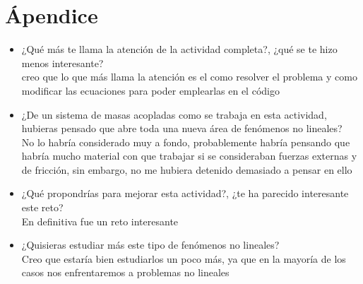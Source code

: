 \documentclass{article}
\begin{document}
\section{Ápendice}
\begin{itemize}
\item ¿Qué más te llama la atención de la actividad completa?, ¿qué se te hizo menos interesante? \\ creo que lo que más llama la atención es el como resolver el problema y como modificar las ecuaciones para poder emplearlas en el código
\item ¿De un sistema de masas acopladas como se trabaja en esta actividad, hubieras pensado que abre toda una nueva área de fenómenos no lineales? \\ No lo habría considerado muy a fondo, probablemente habría pensando que habría mucho material con que trabajar si se consideraban fuerzas externas y de fricción, sin embargo, no me hubiera detenido demasiado a pensar en ello
\item ¿Qué propondrías para mejorar esta actividad?, ¿te ha parecido interesante este reto? \\ En definitiva fue un reto interesante
\item ¿Quisieras estudiar más este tipo de fenómenos no lineales? \\ Creo que estaría bien estudiarlos un poco más, ya que en la mayoría de los casos nos enfrentaremos a problemas no lineales
\end{itemize}
\end{document}
